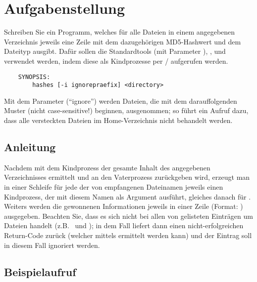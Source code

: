 




\section*{Aufgabenstellung}

Schreiben Sie ein Programm, welches für alle Dateien in einem angegebenen
Verzeichnis jeweils eine Zeile mit dem dazugehörigen MD5-Hashwert und dem
Dateityp ausgibt. Dafür sollen die Standardtools  (mit Parameter
), , und  verwendet werden, indem
diese als Kindprozesse per / aufgerufen
werden.

\begin{verbatim}
    SYNOPSIS:
        hashes [-i ignorepraefix] <directory>
\end{verbatim}

Mit dem Parameter  (``ignore'') werden Dateien, die mit dem
darauffolgenden Muster (nicht case-sensitive!) beginnen, ausgenommen;
so führt ein Aufruf  dazu, dass alle versteckten
Dateien im Home-Verzeichnis nicht behandelt werden.

\subsection*{Anleitung}
Nachdem mit dem Kindprozess  der gesamte Inhalt des angegebenen
Verzeichnisses ermittelt und an den Vaterprozess zurückgeben wird, erzeugt man
in einer Schleife für jede der von  empfangenen Dateinamen jeweils
einen Kindprozess, der  mit diesem Namen als Argument ausführt,
gleiches danach für . Weiters werden die gewonnenen Informationen
jeweils in einer Zeile (Format: )
ausgegeben. Beachten Sie, dass es sich nicht bei allen von 
gelisteten Einträgen um Dateien handelt (z.B.\  und
); in dem Fall liefert dann  einen
nicht-erfolgreichen Return-Code zurück (welcher mittels
 ermittelt werden kann) und der Eintrag
soll in diesem Fall ignoriert werden.

\subsection*{Beispielaufruf}

